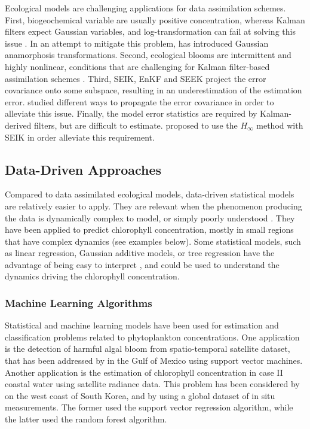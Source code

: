 Ecological models are challenging applications for data assimilation schemes. First, biogeochemical variable are usually positive concentration, whereas Kalman filters expect Gaussian variables, and log-transformation can fail at solving this issue \citep{Ciavatta2011}. In an attempt to mitigate this problem, \citet{Fontana2013} has introduced Gaussian anamorphosis transformations. Second, ecological blooms are intermittent and highly nonlinear, conditions that are challenging for Kalman filter-based assimilation schemes \citep{Triantafyllou2012, Korres2012}. Third, SEIK, EnKF and SEEK project the error covariance onto some subspace, resulting in an underestimation of the estimation error. \citet{Butenschon2012} studied different ways to propagate the error covariance in order to alleviate this issue. Finally, the model error statistics are required by Kalman-derived filters, but are difficult to estimate. \citet{Triantafyllou2012} proposed to use the $H_\infty$ method with SEIK in order alleviate this requirement.

\subsection{Data-Driven Approaches}

Compared to data assimilated ecological models, data-driven statistical models are relatively easier to apply. They are relevant when the phenomenon producing the data is dynamically complex to model, or simply poorly understood \cite{Gareth2013}. They have been applied to predict chlorophyll concentration, mostly in small regions that have complex dynamics (see examples below). Some statistical models, such as linear regression, Gaussian additive models, or tree regression have the advantage of being easy to interpret \citep{Gareth2013}, and could be used to understand the dynamics driving the chlorophyll concentration.

\subsubsection{Machine Learning Algorithms}

Statistical and machine learning models have been used for estimation and classification problems related to phytoplankton concentrations. One application is the detection of harmful algal bloom from spatio-temporal satellite dataset, that has been addressed by \citet{Gokaraju2011} in the Gulf of Mexico using support vector machines. Another application is the estimation of chlorophyll concentration in case II coastal water using satellite radiance data. This problem has been considered by \citet{Kim2014} on the west coast of South Korea, and by \citet{Camps-Valls2006} using a global dataset of in situ measurements. The former used the support vector regression algorithm, while the latter used the random forest algorithm.

